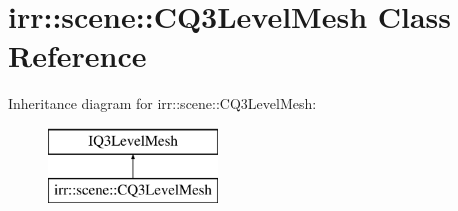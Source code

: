 \hypertarget{classirr_1_1scene_1_1_c_q3_level_mesh}{\section{irr\-:\-:scene\-:\-:C\-Q3\-Level\-Mesh Class Reference}
\label{classirr_1_1scene_1_1_c_q3_level_mesh}
}
Inheritance diagram for irr\-:\-:scene\-:\-:C\-Q3\-Level\-Mesh\-:\begin{figure}[H]
\begin{center}
\leavevmode
\includegraphics[height=2.000000cm]{classirr_1_1scene_1_1_c_q3_level_mesh}
\end{center}
\end{figure}
